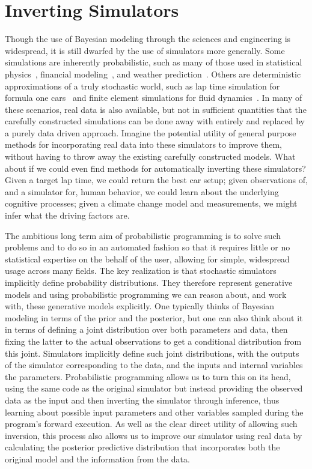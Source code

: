 
\section{Inverting Simulators}
\label{sec:probprog:inv}

Though the use of Bayesian modeling through the sciences and engineering is widespread,
it is still dwarfed by the use of simulators more generally.  Some simulations are inherently
probabilistic, such as many of those used in statistical physics~\citep{landau2014guide},
 financial modeling~\citep{jackel2002monte}, and weather prediction~\cite{evensen1994sequential}.  
 Others are deterministic approximations
of a truly stochastic world, such as lap time simulation for formula one cars~\citep{perantoni2014optimal}
and finite element simulations for fluid dynamics~\citep{versteeg2007introduction}.
In many of these scenarios, real data is also available, but not in sufficient quantities that the carefully
constructed simulations can be done away with entirely and replaced by a purely data driven
approach.  
Imagine the potential utility of general purpose methods for incorporating real data
into these simulators to improve them, without having to throw away the existing carefully constructed models.  
What about if we could even find methods for automatically
inverting these simulators?  Given a target lap time, we could return the best car setup; given observations
of, and a simulator for, human behavior, we could learn about the underlying cognitive processes; given
a climate change model and measurements, we might infer what the driving factors are.  

The ambitious long
term aim of probabilistic programming is to solve such problems and to do so in an automated fashion
so that it requires little or no statistical expertise on the behalf of the user, allowing for simple, widespread usage
across many fields.  The key realization is that stochastic simulators implicitly define probability distributions.
They therefore represent generative models and using probabilistic programming we can reason about, and
work with, these generative models explicitly.  One typically thinks of Bayesian modeling in terms of the
prior and the posterior, but one can also think about it in terms of defining a joint distribution over
both parameters and data, then fixing the latter to the actual observations to get a conditional distribution from
this joint.  Simulators implicitly define such joint distributions, with the outputs of the simulator corresponding
to the data, and the inputs and internal variables the parameters.  Probabilistic programming allows us to turn this on its head,
using the same code as the original simulator but instead providing the observed data as the input and
then inverting the simulator through inference, thus learning about possible input parameters and other 
variables sampled during the program's forward execution.  
As well as the clear direct utility of allowing such inversion, this process also allows us to improve
our simulator using real data by calculating the posterior predictive distribution that incorporates both
the original model and the information from the data.

